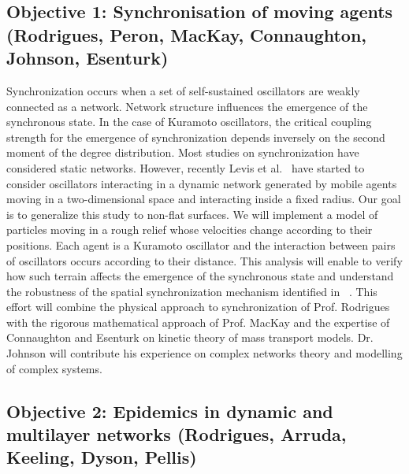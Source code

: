 \subsection{Objective 1:  Synchronisation of moving agents (Rodrigues, Peron,  MacKay, Connaughton, Johnson, Esenturk)}
Synchronization occurs when a set of self-sustained oscillators are weakly 
connected as a network. Network structure influences the emergence of the 
synchronous state. In the case of Kuramoto oscillators, the critical coupling 
strength for the emergence of synchronization depends inversely on the second 
moment of the degree distribution. Most studies on synchronization have considered 
static networks. However, recently Levis et al.~\cite{Levis017} have started to  
consider oscillators interacting in a dynamic network generated by mobile agents 
moving in a two-dimensional space and interacting inside a fixed radius. 
Our goal is to generalize  this study to non-flat surfaces. We will implement a 
model of particles moving in a rough relief whose velocities change according 
to their positions. Each agent is a Kuramoto oscillator and the interaction 
between pairs of oscillators occurs according to their distance. This analysis 
will enable to verify how such terrain affects the emergence of the synchronous 
state and understand the robustness of the spatial synchronization mechanism
identified in~\cite{Levis017} . This effort will combine the physical approach to 
synchronization of Prof. Rodrigues with the rigorous mathematical 
approach of Prof. MacKay and the expertise of Connaughton and Esenturk
on kinetic theory of mass transport models.  Dr. Johnson will contribute  his experience on 
complex networks theory and modelling of complex systems.

\subsection{Objective 2: Epidemics in dynamic and multilayer networks (Rodrigues, Arruda, Keeling, Dyson, Pellis)}

